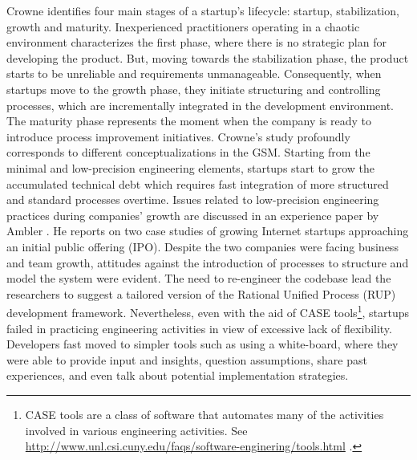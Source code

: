 \documentclass[10pt,journal,letterpaper,compsoc]{IEEEtran}
\begin{document}
Crowne \cite{Crowne2002} identifies four main stages of a startup's lifecycle: 
startup, stabilization, growth and maturity. Inexperienced practitioners 
operating in a chaotic environment characterizes the first phase, where there is 
no strategic plan for developing the product. But, moving towards the 
stabilization phase, the product starts to be unreliable and requirements 
unmanageable. Consequently, when startups move to the growth phase, they 
initiate structuring and controlling processes, which are incrementally 
integrated in the development environment. The maturity phase represents the 
moment when the company is ready to introduce process improvement initiatives. 
Crowne's study profoundly corresponds to different conceptualizations in the 
GSM. Starting from the minimal and low-precision engineering elements, startups 
start to grow the accumulated technical debt which requires fast integration of 
more structured and standard processes overtime.
Issues related to low-precision engineering practices during companies' growth 
are discussed in an experience paper by Ambler \cite{Ambler2002}. He reports on 
two case studies of growing Internet startups approaching an initial public offering (IPO). %
Despite the two companies were facing business and team growth, attitudes 
against the introduction of processes to structure and model the system were 
evident. The need to re-engineer the codebase lead the researchers to suggest a 
tailored version of the Rational Unified Process (RUP) %
development framework. Nevertheless, even with the aid of CASE 
tools\footnote{CASE tools are a class of software that automates many of the 
activities involved in various engineering activities. See 
\url{http://www.unl.csi.cuny.edu/faqs/software-enginering/tools.html} .}, 
startups failed in practicing engineering activities in view of excessive lack of 
flexibility. Developers fast moved to simpler tools such as using a white-board, 
where they were able to provide input and insights, question assumptions, share 
past experiences, and even talk about potential implementation strategies. 
\end{document}
